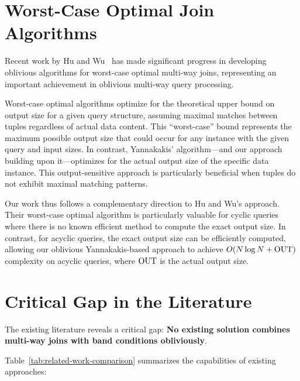 \section{Worst-Case Optimal Join Algorithms}

Recent work by Hu and Wu~\cite{hu2025optimal} has made significant progress in developing oblivious algorithms for worst-case optimal multi-way joins, representing an important achievement in oblivious multi-way query processing.

Worst-case optimal algorithms optimize for the theoretical upper bound on output size for a given query structure, assuming maximal matches between tuples regardless of actual data content. This ``worst-case'' bound represents the maximum possible output size that could occur for any instance with the given query and input sizes. In contrast, Yannakakis' algorithm---and our approach building upon it---optimizes for the actual output size of the specific data instance. This output-sensitive approach is particularly beneficial when tuples do not exhibit maximal matching patterns.

Our work thus follows a complementary direction to Hu and Wu's approach. Their worst-case optimal algorithm is particularly valuable for cyclic queries where there is no known efficient method to compute the exact output size. In contrast, for acyclic queries, the exact output size can be efficiently computed, allowing our oblivious Yannakakis-based approach to achieve $O(N \log N + \text{OUT})$ complexity on acyclic queries, where $\text{OUT}$ is the actual output size.

\section{Critical Gap in the Literature}

The existing literature reveals a critical gap: \textbf{No existing solution combines multi-way joins with band conditions obliviously}. 

Table~\ref{tab:related-work-comparison} summarizes the capabilities of existing approaches:

